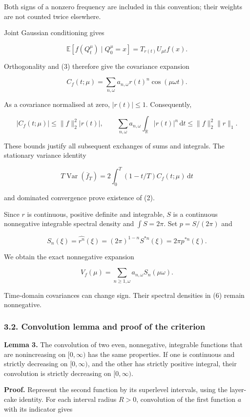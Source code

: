 \documentclass[
  british,
  11pt,
  a4paper,
]{article}
\begin{document}
Both signs of a nonzero frequency are included in this convention; their
weights are not counted twice elsewhere.

Joint Gaussian conditioning gives

\[
\mathbb E[f(Q_t^\mu)\mid Q_0^\mu=x]
=T_{r(t)}U_{\mu t}f(x).
\]

Orthogonality and (3) therefore give the covariance expansion

\[
C_f(t;\mu)=\sum_{n,\omega}a_{n,\omega}r(t)^n\cos(\mu\omega t). \tag{4}
\]

As a covariance normalised at zero, \(|r(t)|\le1\). Consequently,

\[
|C_f(t;\mu)|\le\|f\|_2^2|r(t)|,
\qquad
\sum_{n,\omega}a_{n,\omega}\int_{\mathbb R}|r(t)|^n\,\mathrm dt
\le\|f\|_2^2\|r\|_1. \tag{5}
\]

These bounds justify all subsequent exchanges of sums and integrals. The
stationary variance identity

\[
T\mathop{\mathrm{Var}}(\overline f_T)=2\int_0^T(1-t/T)C_f(t;\mu)\,\mathrm dt
\]

and dominated convergence prove existence of (2).

Since \(r\) is continuous, positive definite and integrable, \(S\) is a
continuous nonnegative integrable spectral density and \(\int S=2\pi\).
Set \(p=S/(2\pi)\) and

\[
S_n(\xi)=\widehat{r^n}(\xi)
=(2\pi)^{1-n}S^{*n}(\xi)=2\pi p^{*n}(\xi).
\]

We obtain the exact nonnegative expansion

\[
\boxed{\displaystyle V_f(\mu)=\sum_{n\ge1,\omega}
a_{n,\omega}S_n(\mu\omega).} \tag{6}
\]

Time-domain covariances can change sign. Their spectral densities in (6)
remain nonnegative.

\subsubsection{3.2. Convolution lemma and proof of the
criterion}\label{convolution-lemma-and-proof-of-the-criterion}

\textbf{Lemma 3.} The convolution of two even, nonnegative, integrable
functions that are nonincreasing on \([0,\infty)\) has the same
properties. If one is continuous and strictly decreasing on
\([0,\infty)\), and the other has strictly positive integral, their
convolution is strictly decreasing on \([0,\infty)\).

\textbf{Proof.} Represent the second function by its superlevel
intervals, using the layer-cake identity. For each interval radius
\(R>0\), convolution of the first function \(a\) with its indicator
gives
\end{document}

